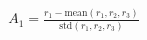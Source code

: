 \documentclass[preview]{standalone}
\begin{document}
\begin{align*}
A_1 = \frac{r_1 - \text{mean}\left({r_1, r_2, r_3}\right)}{\text{std}\left({r_1, r_2, r_3}\right)}
\end{align*}
\end{document}
